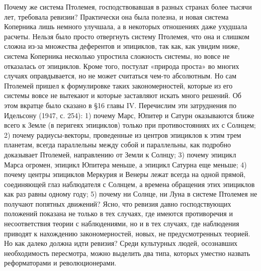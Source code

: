 Почему же  система Птолемея,  господствовавшая в разных  странах более
тысячи лет, требовала  ревизии? Практически она была  полезна, и новая
система Коперника лишь немного улучшала, а в некоторых отношениях даже
ухудшала  расчеты. Нельзя  было  просто  отвергнуть систему  Птолемея,
что  она и  слишком  сложна из-за  множества  деферентов и  эпициклов,
так  как,  как  увидим  ниже, система  Коперника  несколько  упростила
сложность системы,  но вовсе не  отказалась от эпициклов.  Кроме того,
постулат «природа проста» во многих случаях оправдывается, но не может
считаться  чем-то абсолютным.  Но сам  Птолемей пришел  к формулировке
таких  закономерностей, которые  из его  системы вовсе  не вытекают  и
которые заставляют искать много решений.  Об этом вкратце было сказано
в  §16 главы  IV. Перечислим  эти затруднения  по Идельсону  (1947, с.
254): 1) почему Марс, Юпитер и  Сатурн оказываются ближе всего к Земле
(в перигеях  эпициклов) только  при противостояниях  их с  Солнцем; 2)
почему  радиусы-векторы,  проведенные  из  центров  эпициклов  к  этим
трем  планетам,  всегда параллельны  между  собой  и параллельны,  как
подробно доказывает Птолемей, направлению от Земли к Солнцу; 3) почему
эпицикл Марса огромен,  эпицикл Юпитера меньше, а  эпицикл Сатурна еще
меньше; 4) почему  центры эпициклов Меркурия и Венеры  лежат всегда на
одной  прямой,  соединяющей  глаз  наблюдателя с  Солнцем,  а  времена
обращения  этих эпициклов  как раз  равны  одному году;  5) почему  ни
Солнце,  ни Луна  в системе  Птолемея не  получают попятных  движений?
Ясно, что  ревизия давно  господствующих положений показана  не только
в  тех  случаях,  где  имеются противоречия  и  несоответствия  теории
с  наблюдениями,  но  и  в  тех случаях,  где  наблюдения  приводят  к
нахождению  закономерностей,  новых,  не предусмотренных  теорией.  Но
как  далеко должна  идти ревизия?  Среди культурных  людей, осознавших
необходимость  пересмотра, можно  выделить два  типа, которых  уместно
назвать реформаторами и революционерами.

